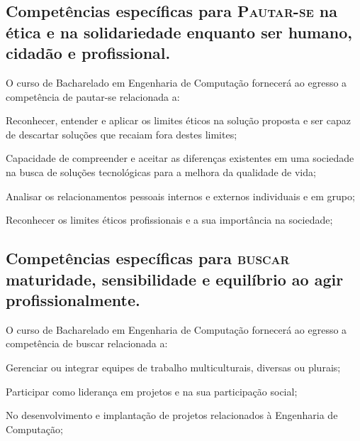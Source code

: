 \subsection*{Competências específicas para \textsc{Pautar-se} na ética e na solidariedade enquanto ser humano, cidadão e profissional.}

O curso de Bacharelado em Engenharia de Computação fornecerá ao egresso a competência de pautar-se relacionada a:
\begin{compitem}
    \item Reconhecer, entender e aplicar os limites éticos na solução proposta e ser capaz de descartar soluções que recaiam fora destes limites;
    \item Capacidade de compreender e aceitar as diferenças existentes em uma sociedade na busca de soluções tecnológicas para a melhora da qualidade de vida; %
    \item Analisar os relacionamentos pessoais internos e externos individuais e em grupo;
    \item Reconhecer os limites éticos profissionais e a sua importância na sociedade;
\end{compitem}

\subsection*{Competências específicas para \textsc{buscar} maturidade, sensibilidade e equilíbrio ao agir profissionalmente.}

O curso de Bacharelado em Engenharia de Computação fornecerá ao egresso a competência de buscar relacionada a:
\begin{compitem}
    \item Gerenciar ou integrar equipes de trabalho multiculturais, diversas ou plurais;%
    \item Participar como liderança em projetos e na sua participação social;
    \item No desenvolvimento e implantação de projetos relacionados à Engenharia de Computação;
\end{compitem}


